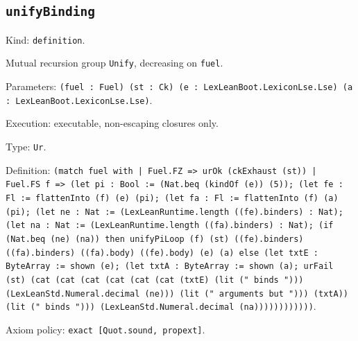 \documentclass[11pt]{article}
\begin{document}
\subsection*{\texttt{unifyBinding}}
\noindent Kind: \texttt{definition}.\par
\noindent Mutual recursion group \texttt{Unify}, decreasing on \texttt{fuel}.\par
\noindent Parameters: \texttt{(fuel : Fuel) (st : Ck) (e : LexLeanBoot.LexiconLse.Lse) (a : LexLeanBoot.LexiconLse.Lse)}.\par
\noindent Execution: executable, non-escaping closures only.\par
\noindent Type: \texttt{Ur}.\par
\noindent Definition: \texttt{(match fuel with | Fuel.FZ => urOk (ckExhaust (st)) | Fuel.FS f => (let pi : Bool := (Nat.beq (kindOf (e)) (5)); (let fe : Fl := flattenInto (f) (e) (pi); (let fa : Fl := flattenInto (f) (a) (pi); (let ne : Nat := (LexLeanRuntime.length ((fe).binders) : Nat); (let na : Nat := (LexLeanRuntime.length ((fa).binders) : Nat); (if (Nat.beq (ne) (na)) then unifyPiLoop (f) (st) ((fe).binders) ((fa).binders) ((fa).body) ((fe).body) (e) (a) else (let txtE : ByteArray := shown (e); (let txtA : ByteArray := shown (a); urFail (st) (cat (cat (cat (cat (cat (cat (txtE) (lit (" binds "))) (LexLeanStd.Numeral.decimal (ne))) (lit (" arguments but "))) (txtA)) (lit (" binds "))) (LexLeanStd.Numeral.decimal (na))))))))))))}.\par
\noindent Axiom policy: \texttt{exact [Quot.sound, propext]}.\par
\end{document}
